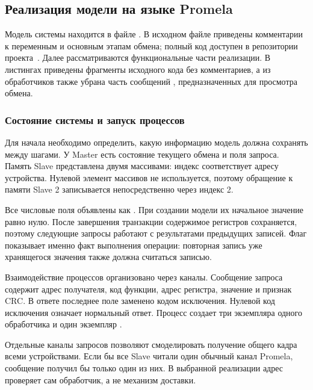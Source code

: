 \subsection{Реализация модели на языке Promela}

Модель системы находится в файле . В исходном файле
приведены комментарии к переменным и основным этапам обмена; полный код
доступен в репозитории проекта~\cite{repo}. Далее рассматриваются
функциональные части реализации. В листингах приведены фрагменты
исходного кода без комментариев, а из обработчиков также убрана часть
сообщений , предназначенных для просмотра обмена.

\subsubsection{Состояние системы и запуск процессов}

Для начала необходимо определить, какую информацию модель должна
сохранять между шагами. У Master есть состояние текущего обмена и поля
запроса. Память Slave представлена двумя массивами: индекс соответствует
адресу устройства. Нулевой элемент массивов не используется, поэтому
обращение к памяти Slave 2 записывается непосредственно через индекс 2.


Все числовые поля объявлены как . При создании модели их
начальное значение равно нулю. После завершения транзакции содержимое
регистров сохраняется, поэтому следующие запросы работают с результатами
предыдущих записей. Флаг  показывает именно
факт выполнения операции: повторная запись уже хранящегося значения также
должна считаться записью.

Взаимодействие процессов организовано через каналы. Сообщение запроса
содержит адрес получателя, код функции, адрес регистра, значение и признак
CRC. В ответе последнее поле заменено кодом исключения. Нулевой код
исключения означает нормальный ответ. Процесс  создает три
экземпляра одного обработчика  и один экземпляр .


Отдельные каналы запросов позволяют смоделировать получение общего кадра
всеми устройствами. Если бы все Slave читали один обычный канал Promela,
сообщение получил бы только один из них. В выбранной реализации адрес
проверяет сам обработчик, а не механизм доставки.

